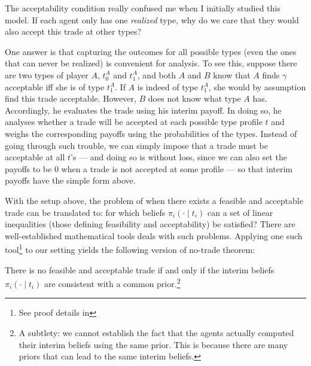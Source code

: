 \begin{remark}
  The acceptability condition really confused me when I initially studied this model.
  If each agent only has one \emph{realized} type, why do we care that they would also accept this trade at other types?

  One answer is that capturing the outcomes for all possible types (even the ones that can never be realized) is convenient for analysis.
  To see this, suppose there are two types of player \(A\), \(t_0^A\) and \(t_1^A\), and both \(A\) and \(B\) know that \(A\) finds \(\gamma\) acceptable iff she is of type \(t_1^A\).
  If \(A\) is indeed of type \(t_1^A\), she would by assumption find this trade acceptable.
  However, \(B\) does not know what type \(A\) has.
  Accordingly, he evaluates the trade using his interim payoff.
  In doing so, he analyses whether a trade will be accepted at each possible type profile \(t\) and weighs the corresponding payoffs using the probabilities of the types.
  Instead of going through such trouble, we can simply impose that a trade must be acceptable at all \(t\)'s --- and doing so is without loss, since we can also set the payoffs to be \(0\) when a trade is not accepted at some profile --- so that interim payoffs have the simple form above.
\end{remark}

With the setup above, the problem of when there exists a feasible and acceptable trade can be translated to: for which beliefs \(\pi_i(\cdot \mid t_i)\) can a set of linear inequalities (those defining feasibility and acceptability) be satisfied?
There are well-established mathematical tools deals with such problems.
Applying one such tool\footnote{See proof details in } to our setting yields the following version of no-trade theorem: 

\begin{theorem}\label{thm:no-trade}
  There is no feasible and acceptable trade if and only if the interim beliefs \(\pi_i(\cdot \mid t_i)\) are consistent with a common prior.\footnote{A subtlety: we cannot establish the fact that the agents actually computed their interim beliefs using the same prior. This is because there are many priors that can lead to the same interim beliefs.}
\end{theorem}

